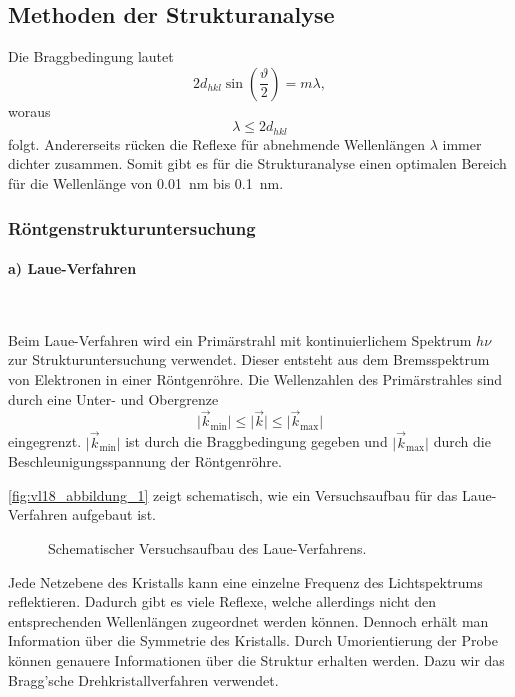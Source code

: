 \setcounter{section}{3}
\setcounter{subsection}{3}
\setcounter{figure}{9}

\subsection{Methoden der Strukturanalyse}
    Die Braggbedingung lautet
    $$
    2d_{hkl} \sin\left( \frac{\vartheta}{2} \right) = m \lambda,
    $$ 
    woraus 
    $$\lambda \le 2 d_{hkl}$$
    folgt. Andererseits rücken die Reflexe für abnehmende Wellenlängen $\lambda$ immer dichter zusammen. Somit gibt es für die Strukturanalyse einen optimalen Bereich für die Wellenlänge von \SI{0,01}{\nano \meter} bis \SI{0,1}{\nano \meter}. 

\subsubsection{Röntgenstrukturuntersuchung}
\paragraph{a) Laue-Verfahren}~

    Beim Laue-Verfahren wird ein Primärstrahl mit kontinuierlichem Spektrum $h\nu$ zur Strukturuntersuchung verwendet. 
    Dieser entsteht aus dem Bremsspektrum von Elektronen in einer Röntgenröhre.
    Die Wellenzahlen des Primärstrahles sind durch eine Unter- und Obergrenze
    $$
    \big| \Vec{k}_{\text{min}} \big| \le \big| \Vec{k} \big| \le \big| \Vec{k}_{\text{max}} \big| 
    $$ 
    eingegrenzt. $\big| \Vec{k}_{\text{min}} \big|$ ist durch die Braggbedingung gegeben und $\big| \Vec{k}_{\text{max}} \big|$ durch die Beschleunigungsspannung der Röntgenröhre.
    
    \autoref{fig:vl18_abbildung_1} zeigt schematisch, wie ein Versuchsaufbau für das Laue-Verfahren aufgebaut ist.

    \begin{figure}[H]
        \centering
        \caption{Schematischer Versuchsaufbau des Laue-Verfahrens.}
        \label{fig:vl18_abbildung_1}
    \end{figure}
    Jede Netzebene des Kristalls kann eine einzelne Frequenz des Lichtspektrums reflektieren. 
    Dadurch gibt es viele Reflexe, welche allerdings nicht den entsprechenden Wellenlängen zugeordnet werden können. 
    Dennoch erhält man Information über die Symmetrie des Kristalls.
    Durch Umorientierung der Probe können genauere Informationen über die Struktur erhalten werden.
    Dazu wir das Bragg'sche Drehkristallverfahren verwendet.

